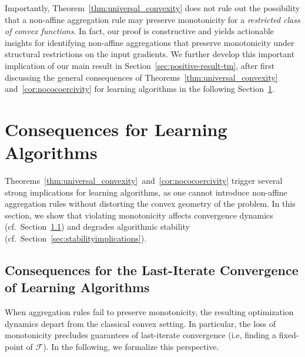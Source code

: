 \documentclass[twoside,11pt]{article}
\newcommand{\F}{\mathcal{F}}
\begin{document}
Importantly, Theorem~\ref{thm:universal_convexity} does not rule out the possibility that a non-affine aggregation rule may preserve monotonicity for a \emph{restricted class of convex functions}.
In fact, our proof is constructive and yields actionable insights for identifying non-affine aggregations that preserve monotonicity under structural restrictions on the input gradients. 
We further develop this important implication of our main result in Section~\ref{sec:positive-result-tm}, after first discussing the general consequences of Theorems~\ref{thm:universal_convexity} and~\ref{cor:nococoercivity} for learning algorithms in the following Section~\ref{sec:consequences}.

\section{Consequences for Learning Algorithms}\label{sec:consequences}

Theorems~\ref{thm:universal_convexity}~and~\ref{cor:nococoercivity} trigger several strong implications for learning algorithms, as
one cannot introduce non-affine aggregation rules without distorting the convex geometry of the problem. 
In this section, we show that violating monotonicity affects convergence dynamics (cf.~Section~\ref{sec:convergenceimplications}) and degrades algorithmic stability (cf.~Section~\ref{sec:stabilityimplications}).



\subsection{Consequences for the Last-Iterate Convergence of Learning Algorithms}\label{sec:convergenceimplications}
When aggregation rules fail to preserve monotonicity, the resulting optimization dynamics depart from the classical convex setting. 
In particular, the loss of monotonicity precludes guarantees of last-iterate convergence (i.e, finding a fixed-point of $\F$).
In the following, we formalize this perspective.
\end{document}
